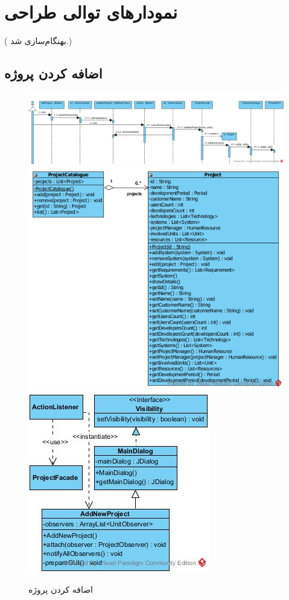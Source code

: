 \chapter{نمودارهای توالی طراحی}
({\color{red}  بهنگام‌سازی شد.})

\begin{landscape}
\newpage
\section{اضافه کردن پروژه}
\begin{figure}[H]
	\centering
	\includegraphics[scale=0.6]{img/sequence-design/AddProjectToOrganization}	
	\includegraphics[scale=0.3]{img/sequence-design/AddProjectToOrganizationC}
	\includegraphics[scale=0.6]{img/sequence-design/AddProjectToOrganizationUI}
	\caption{اضافه کردن پروژه}
\end{figure}


\end{landscape}
